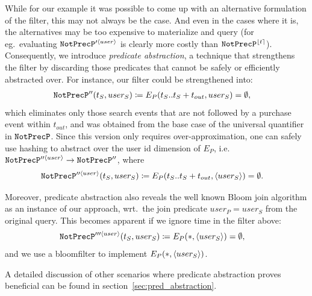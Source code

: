 While for our example it was possible to come up with an alternative formulation
of the filter, this may not always be the case. 
And even in the cases where it is, the alternatives may be too expensive to
materialize and query (for eg.\ evaluating $\texttt{NotPrecP}'^{\langle user \rangle}$ is
clearly more costly than $\texttt{NotPrecP}^{\lfloor t \rceil}$).
Consequently, 
we introduce {\em predicate abstraction}, a technique
that strengthens the filter by discarding those predicates that cannot be safely
or efficiently abstracted over.
For instance, our filter could be strengthened into:
\begin{align*}
&
\texttt{NotPrecP}''(t_S, user_S) \coloneq 
E_P(t_S..t_S + t_{out}, user_S) = \emptyset,
\end{align*} 
which eliminates only those search events that are not followed by a purchase
event within $t_{out}$, and was obtained from the base case of
the universal quantifier in $\texttt{NotPrecP}$.
Since this version only requires over-approximation, one can safely use hashing
to abstract over the user id dimension of $E_P$, i.e.\ 
$\texttt{NotPrecP}''^{\langle user \rangle} \rightarrow \texttt{NotPrecP}''$, where
\begin{align*}
&
\texttt{NotPrecP}''^{\langle user \rangle}(t_S, user_S) \coloneq 
E_P(t_S..t_S + t_{out}, \langle user_S \rangle) = \emptyset .
\end{align*}

Moreover, predicate abstraction also reveals the well known Bloom
join algorithm as an instance of our approach, wrt.\ the join
predicate $user_P = user_S$ from the original query. 
This becomes apparent if we ignore time in the filter above:
\begin{align*}
&
\texttt{NotPrecP}'''^{\langle user \rangle}(t_S, user_S) \coloneq 
E_P(*, \langle user_S \rangle) = \emptyset,
\end{align*}
and we use a bloomfilter to implement $E_P(*, \langle user_S \rangle)$.

A detailed discussion of other scenarios where predicate abstraction proves
beneficial can be found in section~\ref{sec:pred_abstraction}.




